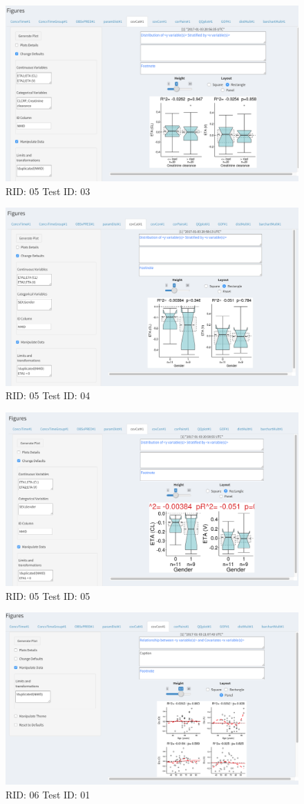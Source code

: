 \begin{figure}[H]
\includegraphics[width=.8\textwidth]{screencaps/05-03-1.png}
\caption{RID: 05 Test ID: 03}
\end{figure}
\begin{figure}[H]
\includegraphics[width=.8\textwidth]{screencaps/05-04-1.png}
\caption{RID: 05 Test ID: 04}
\end{figure}
\begin{figure}[H]
\includegraphics[width=.8\textwidth]{screencaps/05-05-1.png}
\caption{RID: 05 Test ID: 05}
\end{figure}
\begin{figure}[H]
\includegraphics[width=.8\textwidth]{screencaps/06-01-1.png}
\caption{RID: 06 Test ID: 01}
\end{figure}
